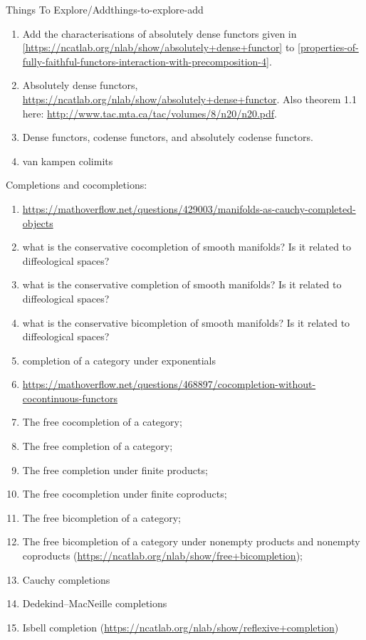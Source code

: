 \begin{remark}{Things To Explore/Add}{things-to-explore-add}
\begin{enumerate}
        \item Add the characterisations of absolutely dense functors given in \cref{https://ncatlab.org/nlab/show/absolutely+dense+functor} to \cref{properties-of-fully-faithful-functors-interaction-with-precomposition-4}.
        \item Absolutely dense functors, \url{https://ncatlab.org/nlab/show/absolutely+dense+functor}. Also theorem 1.1 here: \url{http://www.tac.mta.ca/tac/volumes/8/n20/n20.pdf}.
        \item Dense functors, codense functors, and absolutely codense functors.
        \item van kampen colimits
    \end{enumerate}
    Completions and cocompletions:
    \begin{enumerate}
        \item \url{https://mathoverflow.net/questions/429003/manifolds-as-cauchy-completed-objects}
        \item what is the conservative cocompletion of smooth manifolds? Is it related to diffeological spaces?
        \item what is the conservative completion of smooth manifolds? Is it related to diffeological spaces?
        \item what is the conservative bicompletion of smooth manifolds? Is it related to diffeological spaces?
        \item completion of a category under exponentials
        \item \url{https://mathoverflow.net/questions/468897/cocompletion-without-cocontinuous-functors}
        \item The free cocompletion of a category;
        \item The free completion of a category;
        \item The free completion under finite products;
        \item The free cocompletion under finite coproducts;
        \item The free bicompletion of a category;
        \item The free bicompletion of a category under nonempty products and nonempty coproducts (\url{https://ncatlab.org/nlab/show/free+bicompletion});
        \item Cauchy completions
        \item Dedekind--MacNeille completions
        \item Isbell completion (\url{https://ncatlab.org/nlab/show/reflexive+completion})

\end{enumerate}
\end{remark}
